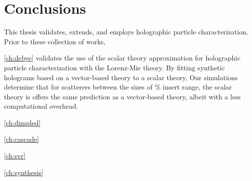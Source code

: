 \chapter{Conclusions}
\label{ch:conclusion}

This thesis validates, extends, and employs holographic
particle characterization. Prior to these collection
of works,

\autoref{ch:debye} validates the use of the scalar theory
approximation for holographic
particle characterization with the Lorenz-Mie theory.
By fitting synthetic holograms based on a vector-based
theory to a scalar theory,
Our simulations determine that for scatterers between the
sizes of \% insert range, the scalar theory is offers
the same prediction as a vector-based theory, albeit
with a less computational overhead. 

\autoref{ch:dimpled}

\autoref{ch:cascade}

\autoref{ch:svr}

\autoref{ch:synthesis}
